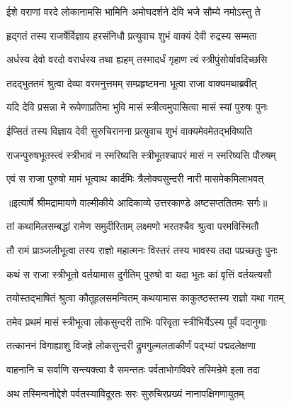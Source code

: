\twolineshloka
{ईशे वराणां वरदे लोकानामसि भामिनि}
{अमोघदर्शने देवि भजे सौम्ये नमोऽस्तु ते} %

\twolineshloka
{हृद्गतं तस्य राजर्षेर्विज्ञाय हरसंनिधौ}
{प्रत्युवाच शुभं वाक्यं देवी रुद्रस्य सम्मता} %

\twolineshloka
{अर्धस्य देवो वरदो वरार्धस्य तथा ह्यहम्}
{तस्मादर्धं गृहाण त्वं स्त्रीपुंसोर्यावदिच्छसि} %

\twolineshloka
{तदद्भुततमं श्रुत्वा देव्या वरमनुत्तमम्}
{सम्प्रहृष्टमना भूत्वा राजा वाक्यमथाब्रवीत्} %

\twolineshloka
{यदि देवि प्रसन्ना मे रूपेणाप्रतिमा भुवि}
{मासं स्त्रीत्वमुपासित्वा मासं स्यां पुरुषः पुनः} %

\twolineshloka
{ईप्सितं तस्य विज्ञाय देवी सुरुचिरानना}
{प्रत्युवाच शुभं वाक्यमेवमेतद्भविष्यति} %

\twolineshloka
{राजन्पुरुषभूतस्त्वं स्त्रीभावं न स्मरिष्यसि}
{स्त्रीभूतश्चापरं मासं न स्मरिष्यसि पौरुषम्} %

\twolineshloka
{एवं स राजा पुरुषो मामं भूत्वाथ कार्दमिः}
{त्रैलोक्यसुन्दरी नारी मासमेकमिलाभवत्} %


{॥इत्यार्षे श्रीमद्रामायणे वाल्मीकीये आदिकाव्ये उत्तरकाण्डे अष्टसप्ततितमः सर्गः॥}


\twolineshloka
{तां कथामिलसम्बद्धां रामेण समुदीरिताम्}
{लक्ष्मणो भरतश्चैव श्रुत्वा परमविस्मितौ} %

\twolineshloka
{तौ रामं प्राञ्जलीभूत्वा तस्य राज्ञो महात्मनः}
{विस्तरं तस्य भावस्य तदा पप्रच्छतुः पुनः} %

\twolineshloka
{कथं स राजा स्त्रीभूतो वर्तयामास दुर्गतिम्}
{पुरुषो वा यदा भूतः कां वृत्तिं वर्तयत्यसौ} %

\twolineshloka
{तयोस्तद्भाषितं श्रुत्वा कौतूहलसमन्वितम्}
{कथयामास काकुत्ष्ठस्तस्य राज्ञो यथा गतम्} %

\twolineshloka
{तमेव प्रथमं मासं स्त्रीभूत्वा लोकसुन्दरी}
{ताभिः परिवृता स्त्रीभिर्येऽस्य पूर्वं पदानुगाः} %

\twolineshloka
{तत्काननं विगाह्याशु विजह्रे लोकसुन्दरी}
{द्रुमगुल्मलताकीर्णं पद्भ्यां पद्मदलेक्षणा} %

\twolineshloka
{वाहनानि च सर्वाणि सन्त्यक्त्वा वै समन्ततः}
{पर्वताभोगविवरे तस्मिन्रेमे इला तदा} %

\twolineshloka
{अथ तस्मिन्वनोद्देशे पर्वतस्याविदूरतः}
{सरः सुरुचिरप्रख्यं नानापक्षिगणायुतम्} %

